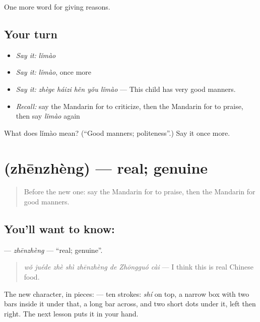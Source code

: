\begin{grammarlens}[title={What you've built}]
One more word for giving reasons.
\end{grammarlens}

\subsection*{Your turn}
\begin{itemize}
\raggedright
  \item \emph{Say it:} \emph{lǐmào}
  \item \emph{Say it:} \emph{lǐmào}, once more
  \item \emph{Say it:} \emph{zhège háizi hěn yǒu lǐmào} — This child has very good manners.
  \item \emph{Recall:} say the Mandarin for to criticize, then the Mandarin for to praise, then say \emph{lǐmào} again
\end{itemize}

\begin{tcolorbox}[breakable,colback=teal!4,colframe=teal!35!black,title={Before you move on}]
What does lǐmào mean? (\textquotedblleft{}Good manners; politeness\textquotedblright{}.) Say it once more.
\end{tcolorbox}
\section[\texorpdfstring{\zh{真正} (zhēnzhèng)}{真正 (zhēnzhèng)}]{ (zhēnzhèng) — real; genuine}

\label{lesson:ZH-C358-zhenzheng}



\begin{quote}
Before the new one: say the Mandarin for to praise, then the Mandarin for good manners.
\end{quote}

\subsection*{You'll want to know: }
\textbf{} — \emph{zhēnzhèng} — \textquotedblleft{}real; genuine\textquotedblright{}.

\begin{quote}
\textbf{} \emph{wǒ juéde zhè shì zhēnzhèng de Zhōngguó cài} — I think this is real Chinese food.
\end{quote}

The new character, in pieces:  — ten strokes:  \emph{shí} on top, a narrow box with two bars inside it under that, a long bar across, and two short dots under it, left then right. The next lesson puts it in your hand.


